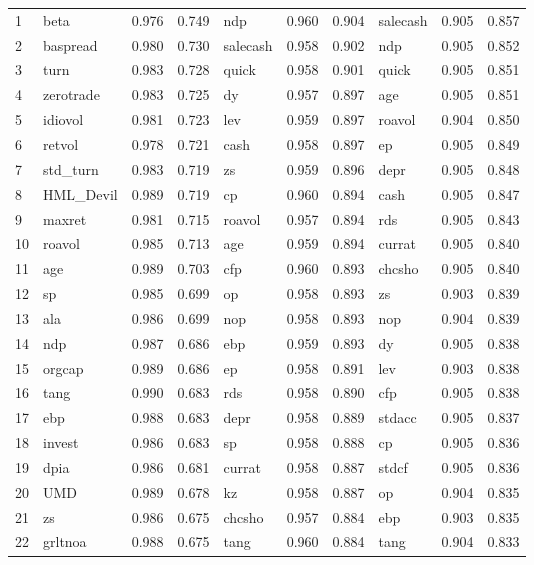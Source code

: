 \begin{landscape}
\begin{footnotesize}
\begin{longtable}{l|lcc|lcc|lcc}
		1 & beta & 0.976 & 0.749 & ndp & 0.960 & 0.904 & salecash & 0.905 & 0.857 \\ 
  2 & baspread & 0.980 & 0.730 & salecash & 0.958 & 0.902 & ndp & 0.905 & 0.852 \\ 
  3 & turn & 0.983 & 0.728 & quick & 0.958 & 0.901 & quick & 0.905 & 0.851 \\ 
  4 & zerotrade & 0.983 & 0.725 & dy & 0.957 & 0.897 & age & 0.905 & 0.851 \\ 
  5 & idiovol & 0.981 & 0.723 & lev & 0.959 & 0.897 & roavol & 0.904 & 0.850 \\ 
  6 & retvol & 0.978 & 0.721 & cash & 0.958 & 0.897 & ep & 0.905 & 0.849 \\ 
  7 & std\_turn & 0.983 & 0.719 & zs & 0.959 & 0.896 & depr & 0.905 & 0.848 \\ 
  8 & HML\_Devil & 0.989 & 0.719 & cp & 0.960 & 0.894 & cash & 0.905 & 0.847 \\ 
  9 & maxret & 0.981 & 0.715 & roavol & 0.957 & 0.894 & rds & 0.905 & 0.843 \\ 
  10 & roavol & 0.985 & 0.713 & age & 0.959 & 0.894 & currat & 0.905 & 0.840 \\ 
  11 & age & 0.989 & 0.703 & cfp & 0.960 & 0.893 & chcsho & 0.905 & 0.840 \\ 
  12 & sp & 0.985 & 0.699 & op & 0.958 & 0.893 & zs & 0.903 & 0.839 \\ 
  13 & ala & 0.986 & 0.699 & nop & 0.958 & 0.893 & nop & 0.904 & 0.839 \\ 
  14 & ndp & 0.987 & 0.686 & ebp & 0.959 & 0.893 & dy & 0.905 & 0.838 \\ 
  15 & orgcap & 0.989 & 0.686 & ep & 0.958 & 0.891 & lev & 0.903 & 0.838 \\ 
  16 & tang & 0.990 & 0.683 & rds & 0.958 & 0.890 & cfp & 0.905 & 0.838 \\ 
  17 & ebp & 0.988 & 0.683 & depr & 0.958 & 0.889 & stdacc & 0.905 & 0.837 \\ 
  18 & invest & 0.986 & 0.683 & sp & 0.958 & 0.888 & cp & 0.905 & 0.836 \\ 
  19 & dpia & 0.986 & 0.681 & currat & 0.958 & 0.887 & stdcf & 0.905 & 0.836 \\ 
  20 & UMD & 0.989 & 0.678 & kz & 0.958 & 0.887 & op & 0.904 & 0.835 \\ 
  21 & zs & 0.986 & 0.675 & chcsho & 0.957 & 0.884 & ebp & 0.903 & 0.835 \\ 
  22 & grltnoa & 0.988 & 0.675 & tang & 0.960 & 0.884 & tang & 0.904 & 0.833 \\ 

\end{longtable}
\end{footnotesize}
\end{landscape}
